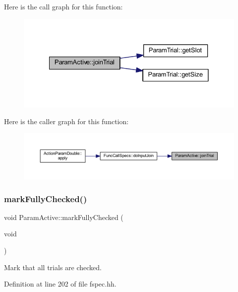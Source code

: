 Here is the call graph for this function\+:
\nopagebreak
\begin{figure}[H]
\begin{center}
\leavevmode
\includegraphics[width=328pt]{class_param_active_a593685d8f2f13f34e5c48f1f363c793d_cgraph}
\end{center}
\end{figure}
Here is the caller graph for this function\+:
\nopagebreak
\begin{figure}[H]
\begin{center}
\leavevmode
\includegraphics[width=350pt]{class_param_active_a593685d8f2f13f34e5c48f1f363c793d_icgraph}
\end{center}
\end{figure}
\mbox{\label{class_param_active_a139fd20617eb3a88e32bc960e03b9ad1}} 
\subsubsection{\texorpdfstring{markFullyChecked()}{markFullyChecked()}}
{\footnotesize\ttfamily void Param\+Active\+::mark\+Fully\+Checked (\begin{DoxyParamCaption}\item[{void}]{ }\end{DoxyParamCaption})\hspace{0.3cm}{\ttfamily [inline]}}



Mark that all trials are checked. 



Definition at line 202 of file fspec.\+hh.

